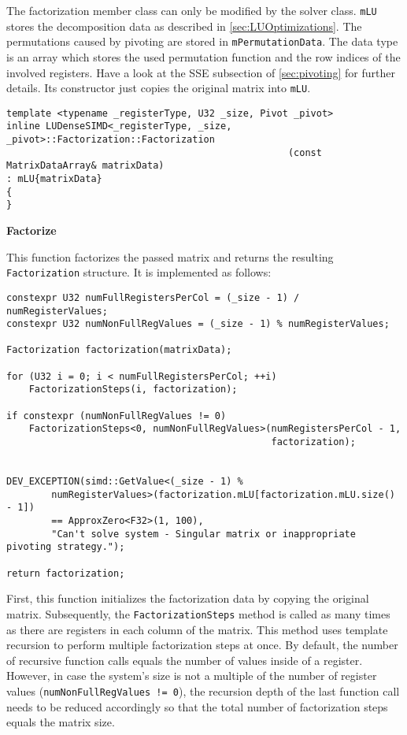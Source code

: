 The factorization member class can only be modified by the solver class.
\texttt{mLU} stores the decomposition data as described in \cref{sec:LUOptimizations}.
The permutations caused by pivoting are stored in \texttt{mPermutationData}.
The data type is an array which stores the used permutation function and the row indices of the involved registers.
Have a look at the SSE subsection of \cref{sec:pivoting} for further details.
Its constructor just copies the original matrix into \texttt{mLU}.

\begin{verbatim}
template <typename _registerType, U32 _size, Pivot _pivot>
inline LUDenseSIMD<_registerType, _size, _pivot>::Factorization::Factorization
                                                  (const MatrixDataArray& matrixData)
: mLU{matrixData}
{
}
\end{verbatim}



\vspace{1cm}
\textbf{Factorize}
\vspace{0.5cm}

This function factorizes the passed matrix and returns the resulting \texttt{Factorization} structure.
It is implemented as follows:

\begin{verbatim}
constexpr U32 numFullRegistersPerCol = (_size - 1) / numRegisterValues;
constexpr U32 numNonFullRegValues = (_size - 1) % numRegisterValues;

Factorization factorization(matrixData);

for (U32 i = 0; i < numFullRegistersPerCol; ++i)
    FactorizationSteps(i, factorization);

if constexpr (numNonFullRegValues != 0)
    FactorizationSteps<0, numNonFullRegValues>(numRegistersPerCol - 1, 
                                               factorization);


DEV_EXCEPTION(simd::GetValue<(_size - 1) % 
        numRegisterValues>(factorization.mLU[factorization.mLU.size() - 1]) 
        == ApproxZero<F32>(1, 100),
        "Can't solve system - Singular matrix or inappropriate pivoting strategy.");

return factorization;
\end{verbatim}

First, this function initializes the factorization data by copying the original matrix.
Subsequently, the \texttt{FactorizationSteps} method is called as many times as there are registers in each column of the matrix.
This method uses template recursion to perform multiple factorization steps at once.
By default, the number of recursive function calls equals the number of values inside of a register.
However, in case the system's size is not a multiple of the number of register values (\texttt{numNonFullRegValues != 0}), the recursion depth of the last function call needs to be reduced accordingly so that the total number of factorization steps equals the matrix size.



